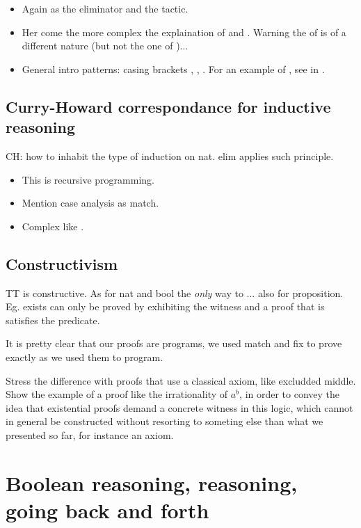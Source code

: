 \begin{itemize}
\item Again  as the eliminator and the   tactic.

\item Her come the more complex the explaination of \C{=>} and
\C{:}. Warning the \C{:} of  is of a different nature (but
not the one of )...

\item General intro patterns: casing brackets \C{[]}, \C{ ->, _},
  . For an example of , see  in
  .
\end{itemize}

\subsection{Curry-Howard correspondance for inductive reasoning}

CH: how to inhabit the type of induction on nat.
elim applies such principle.
\begin{itemize}
\item  This is recursive programming.
\item Mention case analysis as match.
\item Complex  like .
\end{itemize}
\subsection{Constructivism}

TT is constructive.  As for nat and bool the \emph{only} way
to ... also for proposition. Eg. exists can only be proved
by exhibiting the witness and a proof that is satisfies the predicate.

It is pretty clear that our proofs are programs, we used match and fix
to prove exactly as we used them to program.

Stress the difference with proofs that use a classical axiom, like
excludded middle.
Show the example of a proof like the irrationality of $a ^b$, in
order to convey the idea that existential proofs demand a concrete
witness in this logic, which cannot in general be constructed without
resorting to someting else than what we presented so far, for instance
an axiom.



\section{Boolean reasoning,  reasoning, going back and forth}



